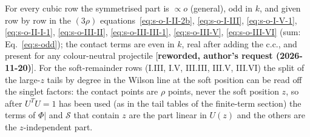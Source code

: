 {\begin{center}
\begin{tabular}{|l|l|l|l|}
\end{tabular}
\end{center}
For every cubic row the symmetrised part is $\propto o$ (general), odd in $k$, and given row by row in the $(3\rho)$ equations~\eqref{eq:s-o-I-II-2b}, \eqref{eq:s-o-I-III}, \eqref{eq:s-o-I-V-1}, \eqref{eq:s-o-II-I-1}, \eqref{eq:s-o-III-II}, \eqref{eq:s-o-III-III-1}, \eqref{eq:s-o-III-V}, \eqref{eq:s-o-III-VI} (sum: Eq.~\eqref{eq:s-odd}); the contact terms are even in $k$, real after adding the c.c., and present for any colour-neutral projectile [\textbf{reworded, author's request (2026-11-20)}]. For the soft-remainder rows (I.III, I.V, III.III, III.V, III.VI) the split of the large-$z$ tails by degree in the Wilson line at the soft position can be read off the singlet factors: the contact points are $\rho$ points, never the soft position $z$, so after $U^{T}U=1$ has been used (as in the tail tables of the finite-term section) the terms of $\Phi|$ and $\mathcal{S}$ that contain $z$ are the part linear in $U(z)$ and the others are the $z$-independent part.

}

